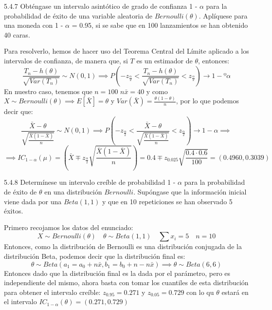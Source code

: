 \begin{problem}{5.4.7}
    Obténgase un intervalo asintótico de grado de confianza 1 - $\alpha$ para la probabilidad de éxito de una variable aleatoria de $Bernoulli(\theta)$. Aplíquese para una moneda con 1 - $\alpha$ = 0.95, si se sabe que en 100 lanzamientos se han obtenido 40 caras.    
\end{problem}
\begin{sol}
    Para resolverlo, hemos de hacer uso del Teorema Central del Límite aplicado a los intervalos de confianza, de manera que, si $T$ es un estimador de $\theta$, entonces:
    $$\frac{T_n - h(\theta)}{\sqrt{Var(T_n)}} \sim N(0,1) \implies P\left(-z_{\frac{\alpha}{2}} < \frac{T_n - h(\theta)}{\sqrt{Var(T_n)}} < z_{\frac{\alpha}{2}}\right) \rightarrow 1 - º\alpha$$
    En nuestro caso, tenemos que $n = 100$ $n\bar{x} = 40$ y como $X \sim Bernoulli(\theta) \implies E[\bar{X}] = \theta$ y $Var(\bar{X}) = \frac{\theta(1 - \theta)}{n}$, por lo que podemos decir que:
    $$\frac{\bar{X} - \theta}{\sqrt{\frac{\bar{X}(1 - \bar{X})}{n}}} \sim N(0,1) \implies P\left(-z_{\frac{\alpha}{2}} < \frac{\bar{X} - \theta}{\sqrt{\frac{\bar{X}(1 - \bar{X})}{n}}} < z_{\frac{\alpha}{2}}\right) \rightarrow 1 - \alpha \implies$$
    $$
    \implies IC_{1- \alpha}(\mu) = \left(\bar{X} \mp z_{\frac{\alpha}{2}}\sqrt{\frac{\bar{X}(1 - \bar{X})}{n}}\right) = 0.4 \mp z_{0.025}\sqrt{\frac{0.4 \cdot 0.6}{100}} = (0.4960, 0.3039)
    $$
\end{sol}
\begin{problem}{5.4.8}
    Determínese un intervalo creíble de probabilidad 1 - $\alpha$ para la probabilidad de éxito de $\theta$ en una distribución $Bernoulli$. Supóngase que la información inicial viene dada por una $Beta(1, 1)$ y que en 10 repeticiones se han observado 5 éxitos. 
\end{problem}
\begin{sol}
    Primero recojamos los datos del enunciado: 
    $$X \sim Bernoulli(\theta) \quad \theta \sim Beta(1, 1) \quad \sum x_i = 5 \quad n = 10$$
    Entonces, como la distribución de Bernoulli es una distribución conjugada de la distribución Beta, podemos decir que la distribución final es:
    $$\theta \sim Beta(a_1 = a_0 + n\bar{x}, b_1 = b_0 + n - n\bar{x}) \implies \theta \sim Beta(6, 6)$$
    Entonces dado que la distribución final es la dada por el parámetro, pero es independiente del mismo, ahora basta con tomar los cuantiles de esta distribución para obtener el intervalo creíble: $z_{0.95} = 0.271$ y $z_{0.05} = 0.729$ con lo qu $\theta$ estará en el intervalo $IC_{1 - \alpha}(\theta) = (0.271, 0.729)$
\end{sol}

